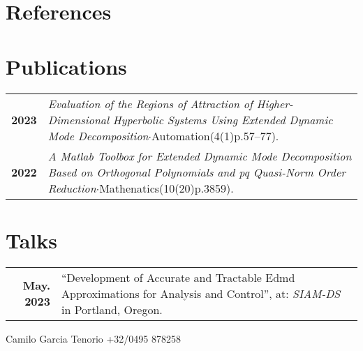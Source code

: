 \documentclass[11pt,a4paper,grey]{hipstercv}
\newlength{\rightcolwidth}
\begin{document}
\begin{paracol}{2}
\begin{minipage}[t]{0.3\textwidth}
\section*{References}
\end{minipage}\hfill
\begin{minipage}[t]{0.3\textwidth}
\section*{Publications}
\begin{tabular}{>{\footnotesize\bfseries}r >{\footnotesize}p{}}
    2023 & \emph{Evaluation of the Regions of Attraction of Higher-Dimensional Hyperbolic Systems Using Extended Dynamic Mode Decomposition}$\cdot$Automation(4(1)p.57--77). \\
    2022 & \emph{A Matlab Toolbox for Extended Dynamic Mode Decomposition Based on Orthogonal Polynomials and pq Quasi-Norm Order Reduction}$\cdot$Mathenatics(10(20)p.3859).
\end{tabular}
\section*{Talks}
\begin{tabular}{>{\footnotesize\bfseries}r >{\footnotesize}p{}}
    May. 2023 & ``Development of Accurate and Tractable Edmd Approximations for Analysis and Control'', at: \emph{SIAM-DS} in Portland, Oregon.
\end{tabular}
\end{minipage}









\vfill{} %

\setlength{\parindent}{0pt}
\begin{minipage}[t]{\rightcolwidth}
\begin{center}\fontfamily{\sfdefault}\selectfont \color{black!70}
  {\small Camilo Garcia Tenorio\href{mailto:camilo_7@msn.com}{} \href{https://www.linkedin.com/in/camilo-garcia-tenorio-08813740/}{\icon{\faLinkedin}{}{}} \href{https://github.com/garten-cam}{\icon{\faGithub}} +32/0495 878258
}
\end{center}
\end{minipage}


\end{paracol}
\end{document}
